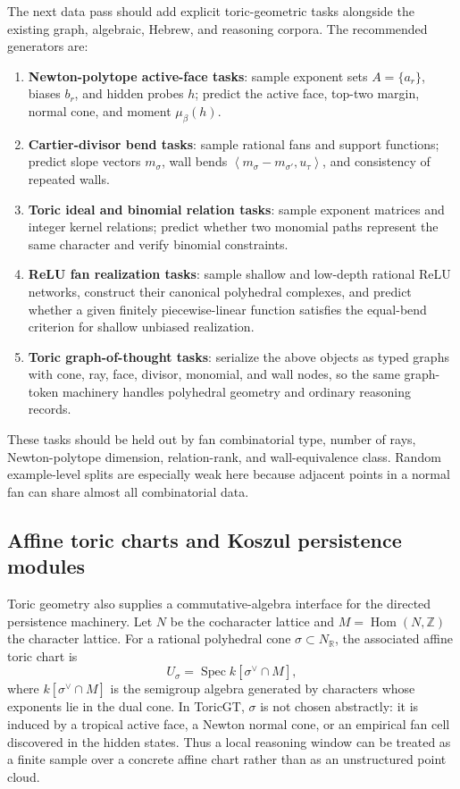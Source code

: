 \documentclass[11pt]{article}
\theoremstyle{definition}
\theoremstyle{plain}
\theoremstyle{remark}
\numberwithin{equation}{section}
\newcommand{\R}{\mathbb{R}}
\newcommand{\Z}{\mathbb{Z}}
\newcommand{\ip}[2]{\left\langle #1,#2\right\rangle}
\begin{document}
The next data pass should add explicit toric-geometric tasks alongside the existing graph, algebraic, Hebrew, and reasoning corpora.  The recommended generators are:
\begin{enumerate}[leftmargin=2em]
  \item \textbf{Newton-polytope active-face tasks}: sample exponent sets $A=\{a_r\}$, biases $b_r$, and hidden probes $h$; predict the active face, top-two margin, normal cone, and moment $\mu_\beta(h)$.
  \item \textbf{Cartier-divisor bend tasks}: sample rational fans and support functions; predict slope vectors $m_\sigma$, wall bends $\ip{m_\sigma-m_{\sigma'}}{u_\tau}$, and consistency of repeated walls.
  \item \textbf{Toric ideal and binomial relation tasks}: sample exponent matrices and integer kernel relations; predict whether two monomial paths represent the same character and verify binomial constraints.
  \item \textbf{ReLU fan realization tasks}: sample shallow and low-depth rational ReLU networks, construct their canonical polyhedral complexes, and predict whether a given finitely piecewise-linear function satisfies the equal-bend criterion for shallow unbiased realization.
  \item \textbf{Toric graph-of-thought tasks}: serialize the above objects as typed graphs with cone, ray, face, divisor, monomial, and wall nodes, so the same graph-token machinery handles polyhedral geometry and ordinary reasoning records.
\end{enumerate}
These tasks should be held out by fan combinatorial type, number of rays, Newton-polytope dimension, relation-rank, and wall-equivalence class.  Random example-level splits are especially weak here because adjacent points in a normal fan can share almost all combinatorial data.

\subsection{Affine toric charts and Koszul persistence modules}

Toric geometry also supplies a commutative-algebra interface for the directed persistence machinery.  Let $N$ be the cocharacter lattice and $M=\operatorname{Hom}(N,\Z)$ the character lattice.  For a rational polyhedral cone $\sigma\subset N_\R$, the associated affine toric chart is
\begin{equation}
  U_\sigma=\operatorname{Spec} k[\sigma^\vee\cap M],
\end{equation}
where $k[\sigma^\vee\cap M]$ is the semigroup algebra generated by characters whose exponents lie in the dual cone.  In ToricGT, $\sigma$ is not chosen abstractly: it is induced by a tropical active face, a Newton normal cone, or an empirical fan cell discovered in the hidden states.  Thus a local reasoning window can be treated as a finite sample over a concrete affine chart rather than as an unstructured point cloud.
\end{document}
